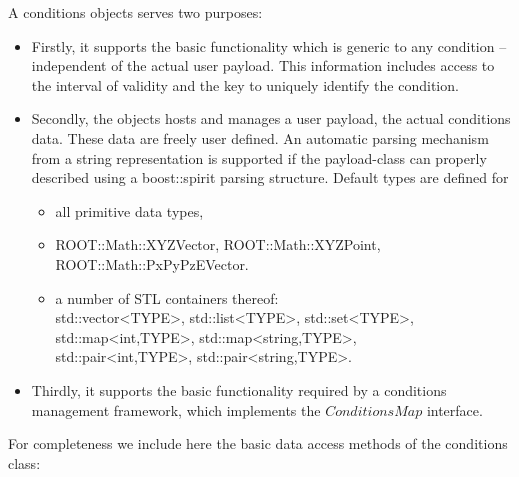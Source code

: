 \documentclass[10pt,a4paper]{article}
\begin{document}
\noindent
A conditions objects serves two purposes:
\begin{itemize}
\item Firstly, it supports the basic functionality which is generic to any 
      condition -- independent of the actual user payload. This information 
      includes access to the interval of validity and the key to uniquely identify
      the condition. 

\item Secondly, the objects hosts and manages a user payload, the actual
      conditions data. These data are freely user defined. An automatic 
      parsing mechanism from a string representation is supported if the 
      payload-class can properly described using a boost::spirit
      parsing structure. Default types are defined for 
    \begin{itemize}
        \item all primitive data types, 
        \item ROOT::Math::XYZVector, ROOT::Math::XYZPoint, ROOT::Math::PxPyPzEVector.
        \item a number of STL containers thereof:\\
                std::vector\textless TYPE\textgreater, 
                std::list\textless TYPE\textgreater,
                std::set\textless TYPE\textgreater,\\
                std::map\textless int,TYPE\textgreater,
                std::map\textless string,TYPE\textgreater,\\
                std::pair\textless int,TYPE\textgreater,
                std::pair\textless string,TYPE\textgreater.
    \end{itemize}

\item Thirdly, it supports the basic functionality required by a 
      conditions management framework, which implements the $ConditionsMap$ 
      interface.
\end{itemize}
For completeness we include here the basic data access methods of the conditions
class:
\vspace{-0.2cm}
\end{document}
